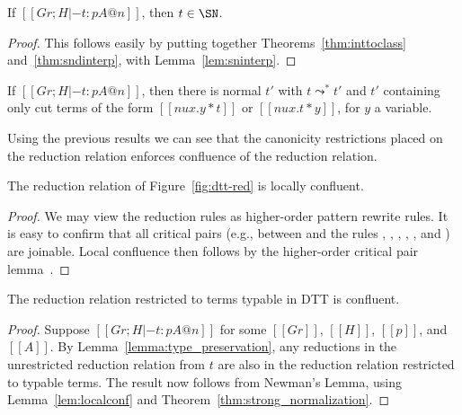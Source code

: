 \begin{corollary}
  \label{thm:strong_normalization}
  If $[[Gr;H |- t : p A@n]]$, then $t \in \SN$.
\end{corollary}
\begin{proof} This follows easily by putting together Theorems~\ref{thm:inttoclass} and~\ref{thm:sndinterp}, with
Lemma~\ref{lem:sninterp}.
\end{proof}

\begin{corollary}
If $[[Gr;H |- t : p A@n]]$, then there is normal $t'$ with
$t\leadsto^* t'$ and $t'$ containing only cut terms of the form
$[[nu x . y * t]]$ or $[[nu x . t * y]]$, for $y$ a variable.
\end{corollary}
Using the previous results we can see that the canonicity restrictions
placed on the reduction relation enforces confluence of the reduction
relation.
\begin{lemma}
\label{lem:localconf}
The reduction relation of Figure~\ref{fig:dtt-red} is locally confluent.
\end{lemma}
\begin{proof} We may view the reduction rules as higher-order pattern
  rewrite rules.  It is easy to confirm that all critical pairs (e.g.,
  between  and the rules ,
  , ,
  , , and
  ) are joinable.  Local confluence then
  follows by the higher-order critical pair lemma~\cite{nipkow91}.
\end{proof}

\begin{thm}
The reduction relation restricted to terms typable in DTT is confluent.
\end{thm}
\begin{proof} Suppose $[[ Gr ; H |- t : p A @ n]]$ for some $[[Gr]]$, $[[H]]$, $[[p]]$, and $[[A]]$.
By Lemma~\ref{lemma:type_preservation}, any reductions in the unrestricted reduction
relation from $t$ are also in the reduction relation restricted to typable terms.
The result now follows from Newman's Lemma, using Lemma~\ref{lem:localconf} and
Theorem~\ref{thm:strong_normalization}.
\end{proof}

